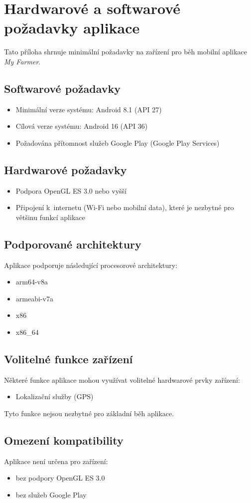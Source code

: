 \chapter{Hardwarové a softwarové požadavky aplikace}\label{ch:requirements}
Tato příloha shrnuje minimální požadavky na zařízení pro běh mobilní aplikace \textit{My Farmer}.


\section{Softwarové požadavky}

\begin{itemize}
    \item Minimální verze systému: Android 8.1 (API 27)
    \item Cílová verze systému: Android 16 (API 36)
    \item Požadována přítomnost služeb Google Play (Google Play Services)
\end{itemize}


\section{Hardwarové požadavky}

\begin{itemize}
    \item Podpora OpenGL ES 3.0 nebo vyšší
    \item Připojení k~internetu (Wi-Fi nebo mobilní data), které je nezbytné pro většinu funkcí aplikace
\end{itemize}


\section{Podporované architektury}
Aplikace podporuje následující procesorové architektury:

\begin{itemize}
    \item arm64-v8a
    \item armeabi-v7a
    \item x86
    \item x86\_64
\end{itemize}


\section{Volitelné funkce zařízení}
Některé funkce aplikace mohou využívat volitelné hardwarové prvky zařízení:

\begin{itemize}
    \item Lokalizační služby (GPS)
\end{itemize}

Tyto funkce nejsou nezbytné pro základní běh aplikace.


\section{Omezení kompatibility}
Aplikace není určena pro zařízení:

\begin{itemize}
    \item bez podpory OpenGL ES 3.0
    \item bez služeb Google Play
\end{itemize}
